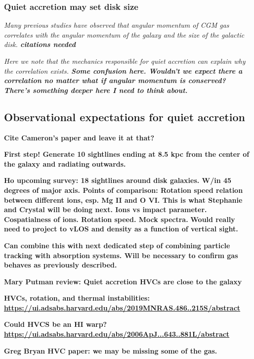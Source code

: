 \documentclass[fleqn,usenatbib]{mnras}
\begin{document}
\subsubsection{Quiet accretion may set disk size}

\textit{
Many previous studies have observed that angular momentum of CGM gas correlates with the angular momentum of the galaxy and the size of the galactic disk.
\textbf{citations needed}
}

\textit{
Here we note that the mechanics responsible for quiet accretion can explain why the correlation exists.
\textbf{Some confusion here. Wouldn't we expect there a correlation no matter what if angular momentum is conserved? There's something deeper here I need to think about.}
}

\subsection{Observational expectations for quiet accretion}
\label{s: observational expectations}

\textbf{
Cite Cameron's paper and leave it at that?
}

\textbf{
First step!
Generate 10 sightlines ending at 8.5 kpc from the center of the galaxy and radiating outwards.
}

\textbf{
Ho upcoming survey:
18 sightlines around disk galaxies.
W/in 45 degrees of major axis.
Points of comparison:
Rotation speed relation between different ions, esp. Mg II and O VI. This is what Stephanie and Crystal will be doing next.
Ions vs impact parameter.
Cospatialness of ions.
Rotation speed.
Mock spectra.
}
\textbf{
Would really need to project to vLOS and density as a function of vertical sight.
}

\textbf{
Can combine this with next dedicated step of combining particle tracking with absorption systems.
Will be necessary to confirm gas behaves as previously described.
}

\textbf{Mary Putman review:
Quiet accretion
HVCs are close to the galaxy}

\textbf{HVCs, rotation, and thermal instabilities:
\url{https://ui.adsabs.harvard.edu/abs/2019MNRAS.486..215S/abstract}
}

\textbf{
Could HVCS be an HI warp?
\url{https://ui.adsabs.harvard.edu/abs/2006ApJ...643..881L/abstract}
}

\textbf{
Greg Bryan HVC paper:
we may be missing some of the gas.
}
\end{document}
